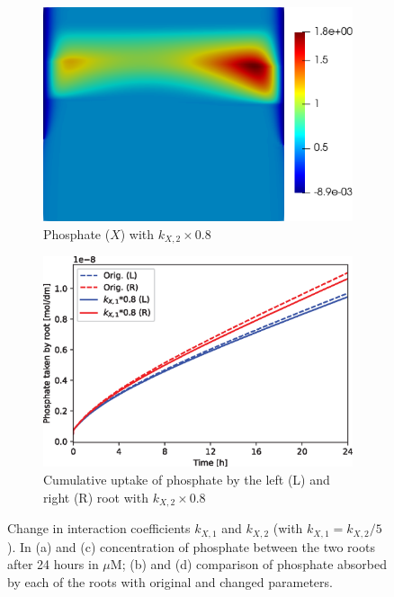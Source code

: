 \documentclass[11pt]{article}
\numberwithin{equation}{section}
\begin{document}
\begin{figure}[!htb]
\begin{subfigure}[t]{0.35\textwidth}
    \includegraphics[width=\textwidth]{Figures/X_kxdown20.png}
    \caption{Phosphate ($X$) with $k_{X,2}\times 0.8$}
    \label{fig:numexp_kdown1}
\end{subfigure}
\hspace{1cm}
\begin{subfigure}[t]{0.4\textwidth}
    \includegraphics[width=\textwidth]{Figures/kxdown20.eps}
    \caption{Cumulative uptake of phosphate by the left (L) and right (R) root with $k_{X,2}\times 0.8$}
    \label{fig:numexp_kdown2}
\end{subfigure}

\caption{Change in interaction coefficients $k_{X,1}$ and $k_{X,2}$ (with $k_{X,1} = k_{X,2}/5$). In (a) and (c) concentration of phosphate between the two roots after 24 hours in $\mu$M; (b) and (d) comparison of phosphate absorbed by each of the roots with original and changed parameters.}
\label{fig:numexp_F11w-k}
\end{figure}
\end{document}
